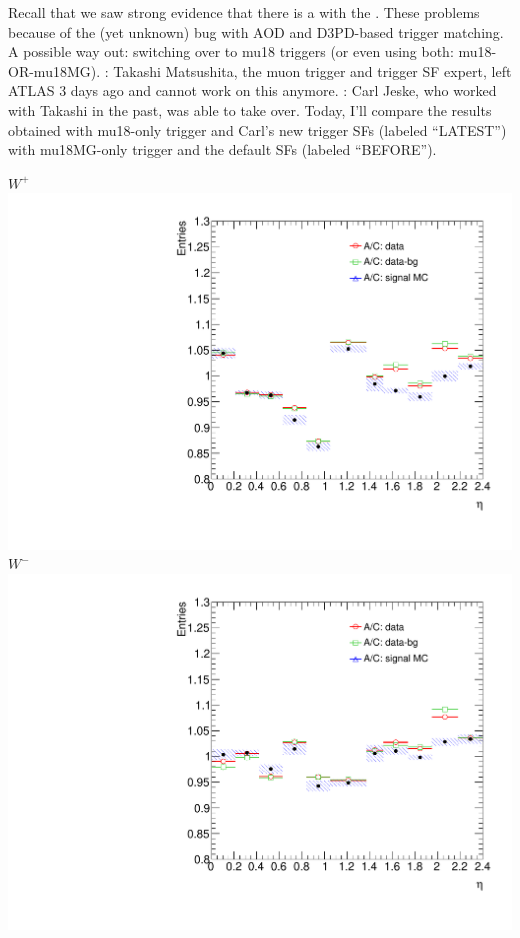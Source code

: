 

{
 {
  Recall that we saw strong evidence that there is a  with the . These problems  because of the (yet unknown) bug with AOD and D3PD-based trigger matching. \\
A possible way out: switching over to mu18 triggers (or even using both: mu18-OR-mu18MG).
}
 {
  : Takashi Matsushita, the muon trigger and trigger SF expert, left ATLAS 3 days ago and cannot work on this anymore.
}
 {
  : Carl Jeske, who worked with Takashi in the past, was able to take over. Today, I'll compare the results obtained with mu18-only trigger and Carl's new trigger SFs (labeled ``LATEST'') with mu18MG-only trigger and the default SFs (labeled ``BEFORE'').
}
}

{
\colb[T]
\centering
\small{ $W^{+}$}
\includegraphics[width=1.0\textwidth]{dates/20130403/figures/old/ACSIDE/W_NOM_Q0_stack_d3_eta_lpt_met_y_2__1_z_0__1_POS}
\centering
\small{ $W^{-}$}
\includegraphics[width=1.0\textwidth]{dates/20130403/figures/old/ACSIDE/W_NOM_Q0_stack_d3_eta_lpt_met_y_2__1_z_0__1_NEG}
\cole
}

